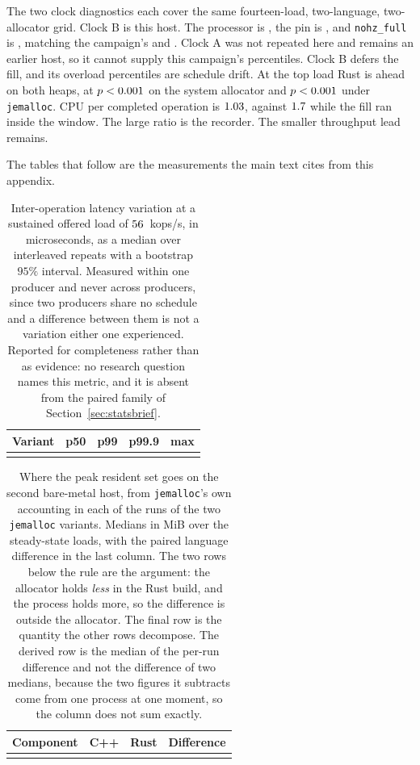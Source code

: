 \documentclass[english,oneside,a4paper,censored,csm,software-track-2020]{HYthesisML}
\begin{document}
\begin{appendices}
The two clock diagnostics each cover the same fourteen-load, two-language,
two-allocator grid. Clock B is this host. The processor is \ProbeAfterCpu{},
the pin is \ProbeAfterPinned{}, and \texttt{nohz\_full} is
\ProbeAfterNohzFull{}, matching the campaign's \MainCpu{} and
\texttt{\MainNohzFull}. Clock A was not repeated here and remains an earlier
host, so it cannot supply this campaign's percentiles. Clock B defers the
fill, and its overload percentiles are schedule drift. At the top load Rust
is ahead on both heaps, at $p <0.001$ on the system allocator
and $p <0.001$ under \texttt{jemalloc}. CPU per completed
operation is $1.03$, against $1.7$
while the fill ran inside the window. The large ratio is the recorder. The
smaller throughput lead remains.

The tables that follow are the measurements the main text cites from this appendix.

\begin{table}[ht]
\centering
\small
\caption[Inter-operation jitter at the representative load]{Inter-operation latency variation at a
sustained offered load of $56$~kops/s, in microseconds, as a median over \NRepeats{}
interleaved repeats with a bootstrap $95\%$ interval. Measured within one producer and never across
producers, since two producers share no schedule and a difference between them is not a variation
either one experienced. Reported for completeness rather than as evidence: no research question
names this metric, and it is absent from the paired family of
Section~\ref{sec:statsbrief}.\label{tab:jitter}}
\begin{tabular}{@{}l r r r r@{}}
\hline\hline
Variant & p50 & p99 & p99.9 & max \\
\hline
\\
\hline
\end{tabular}
\end{table}

\begin{table}[ht]
\centering
\small
\caption[The resident set decomposed by the allocator]{Where the peak resident set goes on the
second bare-metal host, from \texttt{jemalloc}'s own accounting in each of the \BmJeRuns{} runs of
the two \texttt{jemalloc} variants. Medians in MiB over the steady-state loads, with the paired language
difference in the last column. The two rows below the rule are the argument: the allocator holds
\emph{less} in the Rust build, and the process holds more, so the difference is outside the
allocator. The final row is the quantity the other rows decompose. The derived row is the median of
the per-run difference and not the difference of two medians, because the two figures it subtracts
come from one process at one moment, so the column does not sum
exactly.\label{tab:resident}}
\begin{tabular}{@{}l r r r@{}}
\hline\hline
Component & C++ & Rust & Difference \\
\hline
\\
\hline
\end{tabular}
\end{table}


\end{appendices}
\end{document}
